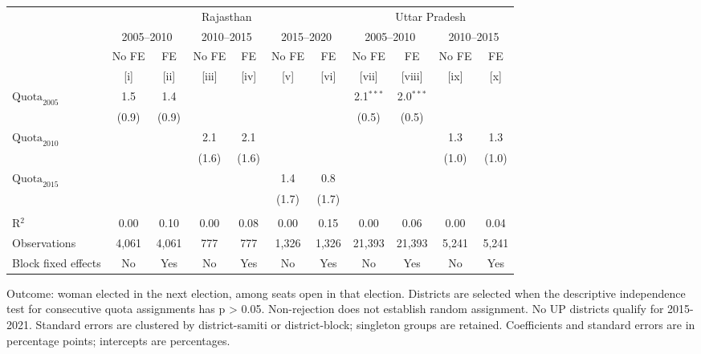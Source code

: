 
\begingroup
\centering
\scriptsize
\begin{adjustbox}{max width=\linewidth}
   \begin{threeparttable}[b]
      \begin{tabular}{lcccccccccc}
         \toprule
          & \multicolumn{6}{c}{Rajasthan} & \multicolumn{4}{c}{Uttar Pradesh} \\
          & \multicolumn{2}{c}{2005--2010} & \multicolumn{2}{c}{2010--2015} & \multicolumn{2}{c}{2015--2020} & \multicolumn{2}{c}{2005--2010} & \multicolumn{2}{c}{2010--2015} \\
                                & No FE & FE    & No FE & FE    & No FE & FE    & No FE       & FE          & No FE & FE \\
                                & [i]   & [ii]  & [iii] & [iv]  & [v]   & [vi]  & [vii]       & [viii]      & [ix]  & [x]\\
         \midrule
         $\text{Quota}_{2005}$  & 1.5   & 1.4   &       &       &       &       & 2.1$^{***}$ & 2.0$^{***}$ &       &   \\
                                & (0.9) & (0.9) &       &       &       &       & (0.5)       & (0.5)       &       &   \\
         $\text{Quota}_{2010}$  &       &       & 2.1   & 2.1   &       &       &             &             & 1.3   & 1.3\\
                                &       &       & (1.6) & (1.6) &       &       &             &             & (1.0) & (1.0)\\
         $\text{Quota}_{2015}$  &       &       &       &       & 1.4   & 0.8   &             &             &       &   \\
                                &       &       &       &       & (1.7) & (1.7) &             &             &       &   \\
          \\
         R$^2$                  & 0.00  & 0.10  & 0.00  & 0.08  & 0.00  & 0.15  & 0.00        & 0.06        & 0.00  & 0.04\\
         Observations           & 4,061 & 4,061 & 777   & 777   & 1,326 & 1,326 & 21,393      & 21,393      & 5,241 & 5,241\\
         Block fixed effects    & No    & Yes   & No    & Yes   & No    & Yes   & No          & Yes         & No    & Yes\\
         \bottomrule
      \end{tabular}

      \begin{tablenotes}
         \item Outcome: woman elected in the next election, among seats open in that election. Districts are selected when the descriptive independence test for consecutive quota assignments has p > 0.05. Non-rejection does not establish random assignment. No UP districts qualify for 2015-2021. Standard errors are clustered by district-samiti or district-block; singleton groups are retained. Coefficients and standard errors are in percentage points; intercepts are percentages.
      \end{tablenotes}
   \end{threeparttable}
\end{adjustbox}
\par\endgroup


